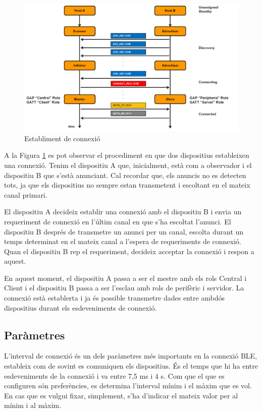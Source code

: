 \begin{figure}[!h]
	\begin{center}
		\includegraphics[width=1\textwidth]{./images/rols_unicast.png}
		\caption{Establiment de connexió \cite{fig:connection_establishement}}
		\label{fig:unicast_roles}
	\end{center}
\end{figure}


A la Figura \ref{fig:unicast_roles} es pot observar el procediment en que dos dispositius estableixen una connexió.
Tenim el dispositiu A que, inicialment, està com a observador i el dispositiu B que s'està anunciant.
Cal recordar que, els anuncis no es detecten tots, ja que els dispositius no sempre estan transmetent i escoltant en el mateix canal primari.

El dispositiu A decideix establir una connexió amb el dispositiu B i envia un requeriment de connexió en l'últim canal en que s'ha escoltat l'anunci.
El dispositiu B després de transmetre un anunci per un canal, escolta durant un temps determinat en el mateix canal a l'espera de requeriments de connexió.
Quan el dispositiu B rep el requeriment, decideix acceptar la connexió i respon a aquest.

En aquest moment, el dispositiu A passa a ser el mestre amb els rols Central i Client i el dispositiu B passa a ser l'esclau amb rols de perifèric i servidor.
La connexió està establerta i ja és possible transmetre dades entre ambdós dispositius durant els esdeveniments de connexió. 


\subsection{Paràmetres}
\label{sec:params}
L'interval de connexió és un dels paràmetres més importants en la connexió BLE, estableix com de sovint es comuniquen els dispositius.
És el temps que hi ha entre esdeveniments de la connexió i va entre 7,5 ms i 4 s.
Com que el que es configuren són preferències, es determina l'interval mínim i el màxim que es vol.
En cas que es vulgui fixar, simplement, s'ha d'indicar el mateix valor per al mínim i al màxim.

